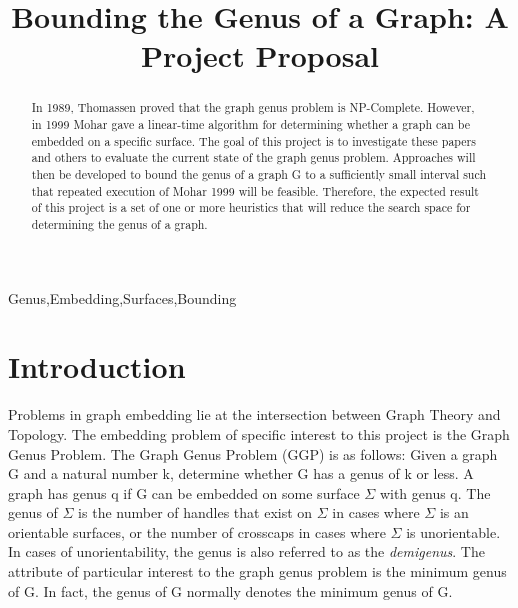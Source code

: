 \documentclass[12pt,conference]{IEEEtran}
\begin{document}
\raggedbottom

\title{Bounding the Genus of a Graph: A Project Proposal}

\author{
}

\maketitle

\begin{abstract}

In 1989, Thomassen proved that the graph genus problem is NP-Complete. However, in 1999 Mohar gave a linear-time algorithm for determining whether a graph can be embedded on a specific surface. The goal of this project is to investigate these papers and others to evaluate the current state of the graph genus problem. Approaches will then be developed to bound the genus of a graph G to a sufficiently small interval such that repeated execution of Mohar 1999 will be feasible. Therefore, the expected result of this project is a set of one or more heuristics that will reduce the search space for determining the genus of a graph.

\end{abstract}

\begin{IEEEkeywords}
Genus,Embedding,Surfaces,Bounding
\end{IEEEkeywords}

\section{Introduction}

Problems in graph embedding lie at the intersection between Graph Theory and Topology. The embedding problem of specific interest to this project is the Graph Genus Problem. The Graph Genus Problem (GGP) is as follows: Given a graph G and a natural number k, determine whether G has a genus of k or less. A graph has genus q if G can be embedded on some surface $\Sigma$ with genus q. The genus of $\Sigma$ is the number of handles that exist on $\Sigma$ in cases where $\Sigma$ is an orientable surfaces, or the number of crosscaps in cases where $\Sigma$ is unorientable. In cases of unorientability, the genus is also referred to as the \textit{demigenus}. The attribute of particular interest to the graph genus problem is the minimum genus of G. In fact, the genus of G normally denotes the minimum genus of G. 
\end{document}
